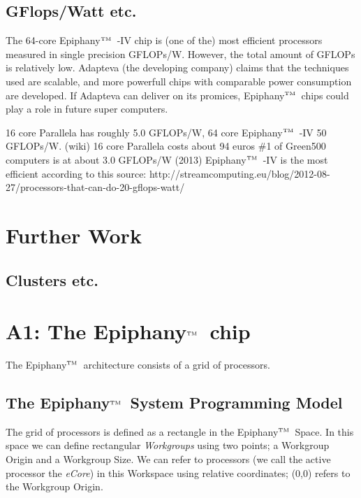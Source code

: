 \documentclass[fleqn]{article}
\renewcommand{\(}{\left(}
\renewcommand{\)}{\right)}
\def\tm{$^{\hbox{\tiny TM}}$~}
\begin{document}
\subsection{GFlops/Watt etc.}
The 64-core Epiphany\tm-IV chip is (one of the) most efficient processors measured in single precision GFLOPs/W. However, the total amount of GFLOPs is relatively low. Adapteva (the developing company) claims that the techniques used are scalable, and more powerfull chips with comparable power consumption are developed. If Adapteva can deliver on its promices, Epiphany\tm chips could play a role in future super computers.

16 core Parallela has roughly 5.0 GFLOPs/W, 64 core Epiphany\tm-IV 50 GFLOPs/W. (wiki)
16 core Parallela costs about 94 euros
\#1 of Green500 computers is at about 3.0 GFLOPs/W (2013)
Epiphany\tm-IV is the most efficient according to this source:
http://streamcomputing.eu/blog/2012-08-27/processors-that-can-do-20-gflops-watt/

\section{Further Work}

\subsection{Clusters etc.}

\section{A1: The Epiphany\tm chip}
The Epiphany\tm architecture consists of a grid of processors.
\subsection{The Epiphany\tm System Programming Model}
The grid of processors is defined as a rectangle in the Epiphany\tm Space. In this space we can define rectangular \textit{Workgroups} using two points; a Workgroup Origin and a Workgroup Size. We can refer to processors (we call the active processor the \textit{eCore}) in this Workspace using relative coordinates; (0,0) refers to the Workgroup Origin.
\end{document}
